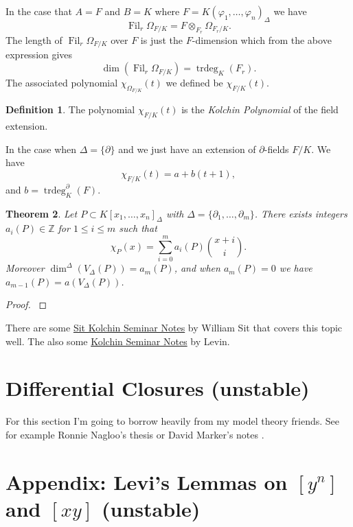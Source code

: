 \documentclass[12pt]{book}
\numberwithin{equation}{section}
\newtheorem{theorem}{Theorem}[subsection]
\theoremstyle{definition}
\newtheorem{definition}[theorem]{Definition}
\theoremstyle{remark}
\newcommand{\trdeg}{\operatorname{trdeg}}
\newcommand{\ZZ}{\mathbb{Z}}
\newcommand{\Fil}{\operatorname{Fil}}
\begin{document}
In the case that $A=F$ and $B=K$ where $F = K(\varphi_1,\ldots,\varphi_n)_{\Delta}$ we have 
$$ \Fil_r \Omega_{F/K} = F\otimes_{F_r} \Omega_{F_r/K}.$$
The length of $\Fil_r \Omega_{F/K}$ over $F$ is just the $F$-dimension which from the above expression gives 
$$ \dim(\Fil_r\Omega_{F/K}) = \trdeg_K(F_r). $$
The associated polynomial $\chi_{\Omega_{F/K}}(t)$ we defined be $\chi_{F/K}(t)$. 
\begin{definition}
	The polynomial $\chi_{F/K}(t)$ is the \emph{Kolchin Polynomial} of the field extension.
\end{definition}

In the case when $\Delta = \lbrace \partial \rbrace$ and we just have an extension of $\partial$-fields $F/K$. 
We have 
$$ \chi_{F/K}(t) = a+b(t+1),$$
and $b=\trdeg^{\partial}_K(F)$.


\begin{theorem}
	Let $P \subset K[x_1,\ldots,x_n]_{\Delta}$ with $\Delta = \lbrace \partial_1,\ldots,\partial_m\rbrace$.
	There exists integers $a_i(P) \in \ZZ$ for $1 \leq i \leq m$ such that 
	$$ \chi_P(x) = \sum_{i=0}^m a_i(P) {x+i \choose i }. $$
	Moreover $\dim^{\Delta}(V_{\Delta}(P)) = a_m(P)$, and when $a_m(P)=0$ we have $a_{m-1}(P) = a(V_{\Delta}(P))$.
\end{theorem}
\begin{proof}
	\cite[pages 129-130]{Kolchin1973}
\end{proof}

There are some \href{https://ksda.ccny.cuny.edu/PostedPapers/10-21-05KSDA.pdf}{Sit Kolchin Seminar Notes} by William Sit that covers this topic well.
The also some \href{https://ksda.ccny.cuny.edu/PostedPapers/10-21-05KSDA.pdf}{ Kolchin Seminar Notes} by Levin. 



\section{Differential Closures (unstable) \label{S:univariate-differential-closures}}
For this section I'm going to borrow heavily from my model theory friends.
See for example Ronnie Nagloo's thesis or David Marker's notes \cite{Marker2000}.


\section{Appendix: Levi's Lemmas on $[y^n]$ and $[xy]$ (unstable)}\label{S:levi}
\end{document}

